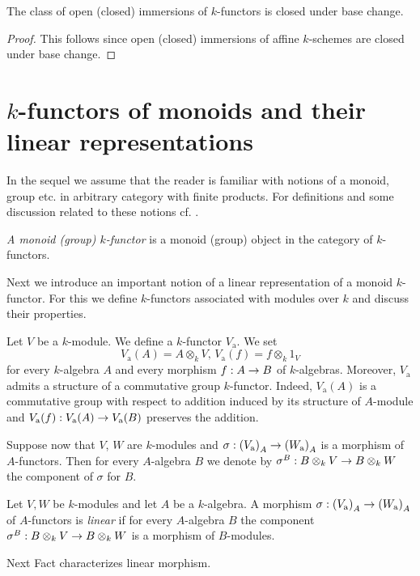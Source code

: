 \begin{fact}\label{fact:openclosedimmersionsclosedunderbasechange}
The class of open (closed) immersions of $k$-functors is closed under base change.
\end{fact}
\begin{proof}
This follows since open (closed) immersions of affine $k$-schemes are closed under base change.
\end{proof}

\section{$k$-functors of monoids and their linear representations}
\noindent
In the sequel we assume that the reader is familiar with notions of a monoid, group etc. in arbitrary category with finite products. For definitions and some discussion related to these notions cf. {\cite[pages 2-5]{Maclane}}.

\begin{definition}
\textit{A monoid (group) $k$-functor} is a monoid (group) object in the category of $k$-functors.
\end{definition}
\noindent
Next we introduce an important notion of a linear representation of a monoid $k$-functor. For this we define $k$-functors associated with modules over $k$ and discuss their properties.

\begin{example}\label{example:additivekfunctor}
Let $V$ be a $k$-module. We define a $k$-functor $V_{\mathrm{a}}$. We set
$$V_{\mathrm{a}}(A) = A\otimes_kV,\,V_{\mathrm{a}}(f) = f\otimes_k1_V$$
for every $k$-algebra $A$ and every morphism $f:A\rightarrow B$ of $k$-algebras. Moreover, $V_{\mathrm{a}}$ admits a structure of a commutative group $k$-functor. Indeed, $V_{\mathrm{a}}(A)$ is a commutative group with respect to addition induced by its structure of $A$-module and $V_{\mathrm{a}}(f):V_{\mathrm{a}}(A)\rightarrow V_{\mathrm{a}}(B)$ preserves the addition.
\end{example}
\noindent
Suppose now that $V$, $W$ are $k$-modules and $\sigma:\left(V_{\mathrm{a}}\right)_A\rightarrow \left(W_{\mathrm{a}}\right)_A$ is a morphism of $A$-functors. Then for every $A$-algebra $B$ we denote by $\sigma^B:B\otimes_kV\rightarrow B\otimes_kW$ the component of $\sigma$ for $B$.

\begin{definition}
Let $V,W$ be $k$-modules and let $A$ be a $k$-algebra. A morphism $\sigma:\left(V_{\mathrm{a}}\right)_A\rightarrow \left(W_{\mathrm{a}}\right)_A$ of $A$-functors is \textit{linear} if for every $A$-algebra $B$ the component $\sigma^B:B\otimes_kV\rightarrow B\otimes_kW$ is a morphism of $B$-modules.
\end{definition}
\noindent
Next Fact characterizes linear morphism.

